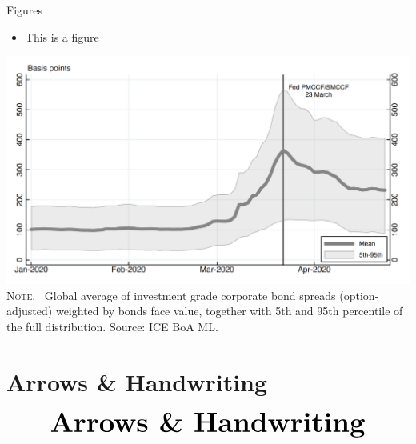 \documentclass[10pt]{beamer}
\begin{document}
\begin{frame}
	{Figures}
	\begin{itemize}
		\item This is a figure
	\end{itemize}
	\begin{center}
		\begin{minipage}[b]{.6\textwidth}
			\includegraphics[width=\textwidth]{figure}\\
			\tiny{{\scshape Note}. \ Global average of investment grade corporate bond spreads (option-adjusted) weighted by bonds face value, together with 5th and 95th percentile of the full distribution. Source: ICE BoA ML.}
		\end{minipage}
	\end{center}
\end{frame}



\section{Arrows \& Handwriting}
\begin{frame}
	\begin{eqnarray*}
		&\text{{\Huge \textbf{Arrows \& Handwriting}}}\\
	\end{eqnarray*}
\end{frame}

\end{document}
